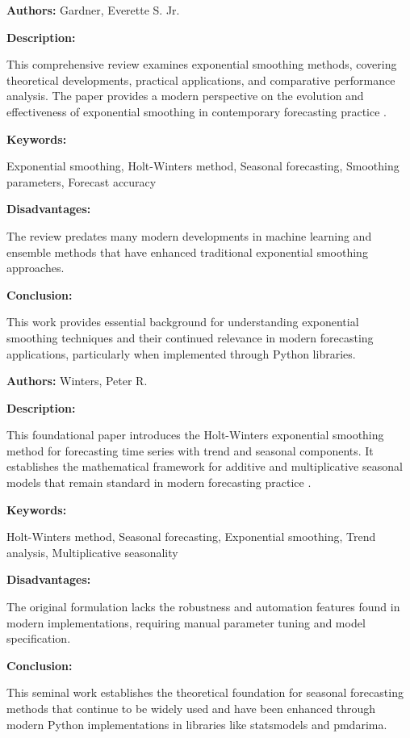 
{ 
	
	\textbf{Authors:} Gardner, Everette S. Jr.
	
	\textbf{Description:} 
	
	This comprehensive review examines exponential smoothing methods, covering theoretical developments, practical applications, and comparative performance analysis. The paper provides a modern perspective on the evolution and effectiveness of exponential smoothing in contemporary forecasting practice \autocite{Gardner:2006}.
	
	\textbf{Keywords:} 
	
	Exponential smoothing, Holt-Winters method, Seasonal forecasting, Smoothing parameters, Forecast accuracy
	
	\textbf{Disadvantages:} 
	
	The review predates many modern developments in machine learning and ensemble methods that have enhanced traditional exponential smoothing approaches.
	
	\textbf{Conclusion:} 
	
	This work provides essential background for understanding exponential smoothing techniques and their continued relevance in modern forecasting applications, particularly when implemented through Python libraries.
	
}


{ 
	
	\textbf{Authors:} Winters, Peter R.
	
	\textbf{Description:} 
	
	This foundational paper introduces the Holt-Winters exponential smoothing method for forecasting time series with trend and seasonal components. It establishes the mathematical framework for additive and multiplicative seasonal models that remain standard in modern forecasting practice \autocite{Winters:1960}.
	
	\textbf{Keywords:} 
	
	Holt-Winters method, Seasonal forecasting, Exponential smoothing, Trend analysis, Multiplicative seasonality
	
	\textbf{Disadvantages:} 
	
	The original formulation lacks the robustness and automation features found in modern implementations, requiring manual parameter tuning and model specification.
	
	\textbf{Conclusion:} 
	
	This seminal work establishes the theoretical foundation for seasonal forecasting methods that continue to be widely used and have been enhanced through modern Python implementations in libraries like statsmodels and pmdarima.
	
}

